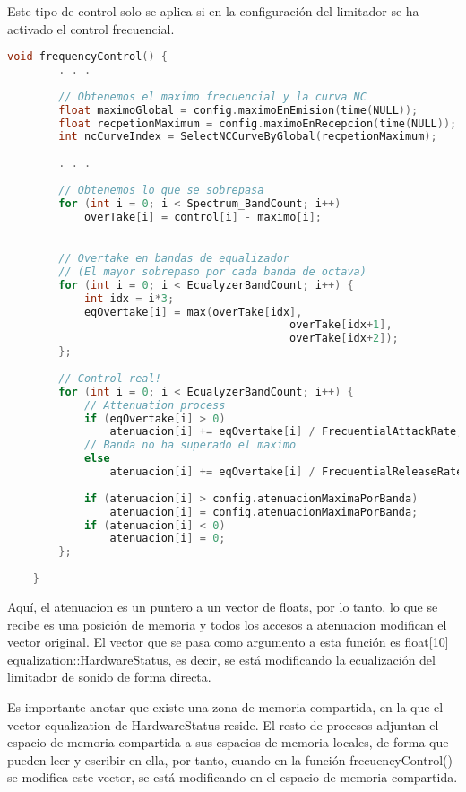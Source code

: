 \documentclass[]{article}
\begin{document}
Este tipo de control solo se aplica si en la configuración del limitador se ha activado el control frecuencial.

\begin{lstlisting}[language=c++ ,caption=Control frecuencial]
	void frequencyControl() {
		. . .
		
		// Obtenemos el maximo frecuencial y la curva NC
		float maximoGlobal = config.maximoEnEmision(time(NULL));
		float recpetionMaximum = config.maximoEnRecepcion(time(NULL));
		int ncCurveIndex = SelectNCCurveByGlobal(recpetionMaximum);
		
		. . .
		
		// Obtenemos lo que se sobrepasa
		for (int i = 0; i < Spectrum_BandCount; i++)
			overTake[i] = control[i] - maximo[i];

		
		// Overtake en bandas de equalizador 
		// (El mayor sobrepaso por cada banda de octava)
		for (int i = 0; i < EcualyzerBandCount; i++) {
			int idx = i*3;
			eqOvertake[i] = max(overTake[idx], 
											overTake[idx+1], 
											overTake[idx+2]);
		};
	
		// Control real!
		for (int i = 0; i < EcualyzerBandCount; i++) {
			// Attenuation process
			if (eqOvertake[i] > 0)
				atenuacion[i] += eqOvertake[i] / FrecuentialAttackRate;
			// Banda no ha superado el maximo
			else
				atenuacion[i] += eqOvertake[i] / FrecuentialReleaseRate;
			
			if (atenuacion[i] > config.atenuacionMaximaPorBanda)
				atenuacion[i] = config.atenuacionMaximaPorBanda;
			if (atenuacion[i] < 0)
				atenuacion[i] = 0;
		};
			
	}
\end{lstlisting}

Aquí, el atenuacion es un puntero a un vector de floats, por lo tanto, lo que se recibe es una posición de memoria y todos los accesos a atenuacion modifican el  vector original. El vector que se pasa como argumento a esta función es float[10] equalization::HardwareStatus, es decir, se está modificando la ecualización del limitador de sonido de forma directa.

Es importante anotar que existe una zona de memoria compartida, en la que el vector equalization de HardwareStatus reside. El resto de procesos adjuntan el espacio de memoria compartida a sus espacios de memoria locales, de forma que pueden leer y escribir en ella, por tanto, cuando en la función frecuencyControl() se modifica este vector, se está modificando en el espacio de memoria compartida.
\end{document}
